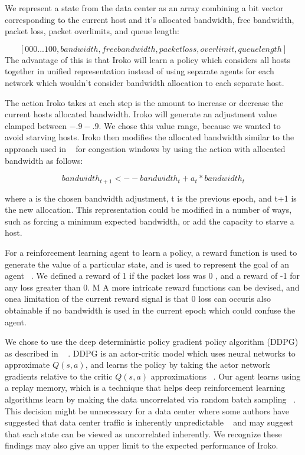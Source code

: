 We represent a state from the data center as an array combining a bit vector corresponding to the current host and it's allocated bandwidth, free bandwidth, packet loss, packet overlimits, and queue length:

\[ [0 0 0 ... 1 0 0, bandwidth, free bandwidth, packet loss, overlimit, queue length ] \]
The advantage of this is that Iroko will learn a policy which considers all hosts together in unified representation instead of using separate agents for each network which wouldn't consider bandwidth allocation to each separate host.

The action Iroko takes at each step is the amount to increase or decrease the current hosts allocated bandwidth. Iroko will generate an adjustment value clamped between $-.9 - .9$. We chose this value range, because we wanted to avoid starving hosts.  Iroko then modifies the allocated bandwidth similar to the approach used in ~\cite{remy} for congestion windows by using the action with allocated bandwidth as follows:

\[bandwidth_{t+1}   <-- bandwidth_t +  a_t * bandwidth_t\]

where a is the chosen bandwidth adjustment, t is the previous epoch, and t+1 is the new allocation. This representation could be  modified in a number of ways, such as forcing a minimum expected bandwidth, or add the capacity to starve a host.
 
 
For a reinforcement learning agent to learn a policy, a reward function is used to generate the value of a particular state, and is used to represent the goal of an agent ~\cite{Sutton:1998:IRL:551283}. We defined  a reward of 1 if the packet loss was 0 , and a reward of -1 for any loss greater than 0. M  A more intricate reward functions can be devised, and onea limitation of the current reward signal is that 0 loss can occuris also obtainable if no bandwidth is used in the current epoch which could confuse the agent. 



We chose to use the deep deterministic policy gradient policy algorithm (DDPG) as described in ~\cite{DDPG} . DDPG is an actor-critic model which uses neural networks to approximate $Q(s,a)$, and learns the policy by taking the actor network gradients relative to the critic $Q(s,a)$ approximations ~\cite{DDPG}.  Our agent learns using a replay memory, which is a technique that helps deep reinforcement learning algorithms learn by making the data uncorrelated via random batch sampling ~\cite{DQLearning}. This decision might be unnecessary for a data center where some authors have suggested that data center traffic is inherently unpredictable ~\cite{microte} and may suggest that each state can be viewed as uncorrelated inherently. We recognize these findings may also give an upper limit to the expected performance of Iroko. 

